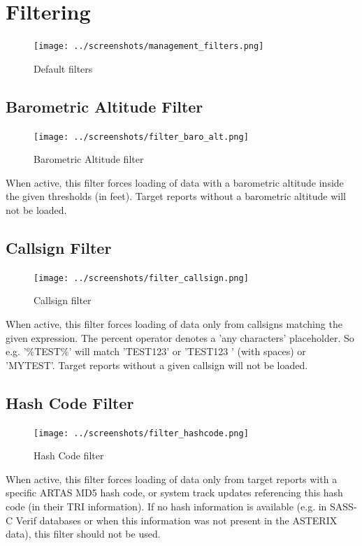 \section{Filtering}
\label{sec:filtering}

\begin{figure}[H]
  \center
    \texttt{[image: ../screenshots/management\_filters.png]}
  \caption{Default filters}
\end{figure}

\subsection{Barometric Altitude Filter}

\begin{figure}[H]
  \center
    \texttt{[image: ../screenshots/filter\_baro\_alt.png]}
  \caption{Barometric Altitude filter}
\end{figure}

When active, this filter forces loading of data with a barometric altitude inside the given thresholds (in feet). Target reports without a barometric altitude will not be loaded.

\subsection{Callsign Filter}

\begin{figure}[H]
  \center
    \texttt{[image: ../screenshots/filter\_callsign.png]}
  \caption{Callsign filter}
\end{figure}

When active, this filter forces loading of data only from callsigns matching the given expression. The percent operator denotes a 'any characters' placeholder. So e.g. '\%TEST\%' will match 'TEST123' or 'TEST123   ' (with spaces) or 'MYTEST'. Target reports without a given callsign will not be loaded.

\subsection{Hash Code Filter}

\begin{figure}[H]
  \center
    \texttt{[image: ../screenshots/filter\_hashcode.png]}
  \caption{Hash Code filter}
\end{figure}

When active, this filter forces loading of data only from target reports with a specific ARTAS MD5 hash code, or system track updates referencing this hash code (in their TRI information). If no hash information is available (e.g. in SASS-C Verif databases or when this information was not present in the ASTERIX data), this filter should not be used.

